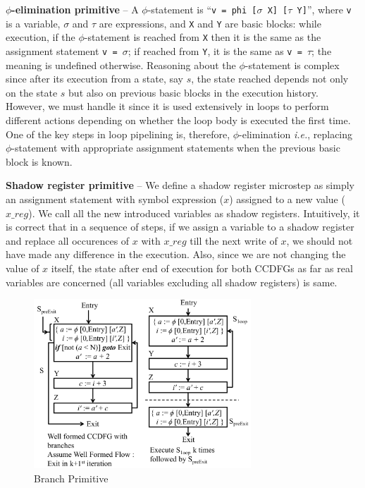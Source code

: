 {\textbf {$\phi$-elimination primitive}} -- A $\phi$-statement is ``{\tt v = phi
[$\sigma$ X] [$\tau$ Y]}'', where {\tt v} is a
variable, $\sigma$ and $\tau$ are expressions, and {\tt X}
and {\tt Y} are basic blocks: while execution, if the $\phi$-statement is
reached from {\tt X} then it
is the same as the assignment statement
{\tt v = $\sigma$}; if reached from {\tt Y}, it is the same as {\tt v = $\tau$};
the meaning is undefined otherwise.
Reasoning about the $\phi$-statement is complex since after its
execution from a state, say $s$, the state reached depends not only
on the state $s$ but also on previous basic blocks in the execution history.
However, we must handle it since it is used extensively in
loops to perform different actions depending on whether the
loop body is executed the first time. One of the key steps in loop pipelining is,
therefore, $\phi$-elimination {\em i.e.}, replacing
$\phi$-statement with appropriate assignment statements when the previous basic block is known.

{\textbf {Shadow register primitive}} -- We define a shadow register microstep as simply an assignment
statement with symbol expression ($x$) assigned to a new value ($x\_reg$). We call all the new introduced variables as shadow registers. Intuitively, it is correct that in a sequence of steps, if we assign a variable to a shadow register and replace all occurences of $x$ with $x\_reg$
till the next write of $x$, we should
not have made any difference in the execution. Also, since we are not changing the value of $x$ itself, the state after end of execution for both CCDFGs as far as real variables are concerned (all variables
 excluding all shadow registers) is same. 

\begin{figure}[H]
\begin{center}
\includegraphics[height=2.5in]{fig-proposal/conditional-branch-primitive}
\end{center}
\caption{Branch Primitive}
\label{fig:branch-primitive}
\end{figure}

